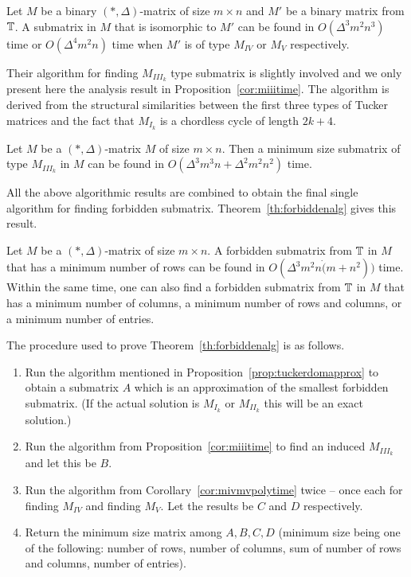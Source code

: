 \begin{corollary} 
  \label{cor:mivmvpolytime}
  Let $M$ be a binary $(*, \Delta)$-matrix of size $m \times n$ and
  $M'$ be a binary matrix from $\mathbb{T}$. A submatrix in $M$ that
  is isomorphic to $M'$ can be found in $O(\Delta^3m^2n^3)$ time or
  $O(\Delta^4m^2n)$ time when $M'$ is of type $M_{IV}$ or $M_V$
  respectively.
\end{corollary}

Their algorithm for finding $M_{III_k}$ type submatrix is slightly
involved and we only present here the analysis result in
Proposition~\ref{cor:miiitime}. The algorithm is derived from the
structural similarities between the first three types of Tucker
matrices and the fact that $M_{I_k}$ is a chordless cycle of length
$2k+4$.

\begin{proposition} 
  \label{cor:miiitime}
  Let $M$ be a $(*,\Delta)$-matrix $M$ of size $m \times n$. Then a
  minimum size submatrix of type $M_{III_k}$ in $M$ can be found in
  $O(\Delta^3m^3n+\Delta^2m^2n^2)$ time.
\end{proposition}

All the above algorithmic results are combined to obtain the final
single algorithm for finding forbidden
submatrix. Theorem~\ref{th:forbiddenalg} gives this result.

\begin{theoremsansproof}
  \label{th:forbiddenalg}
  Let $M$ be a $(*,\Delta)$-matrix of size $m \times n$. A forbidden
  submatrix from $\mathbb{T}$ in $M$ that has a minimum number of rows
  can be found in $O(\Delta^3m^2n\dot(m+n^2))$ time. Within the same
  time, one can also find a forbidden submatrix from $\mathbb{T}$ in
  $M$ that has a minimum number of columns, a minimum number of rows
  and columns, or a minimum number of \un entries.
\end{theoremsansproof}

The procedure used to prove Theorem~\ref{th:forbiddenalg} is as
follows. 
\begin{enumerate}
\item Run the algorithm mentioned in
  Proposition~\ref{prop:tuckerdomapprox} to obtain a submatrix $A$
  which is an approximation of the smallest forbidden submatrix. (If
  the actual solution is $M_{I_k}$ or $M_{II_k}$ this will be an exact
  solution.)
\item Run the algorithm from Proposition~\ref{cor:miiitime} to find
  an induced $M_{III_k}$ and let this be $B$.
\item Run the algorithm from Corollary~\ref{cor:mivmvpolytime} twice
  -- once each for finding $M_{IV}$ and finding $M_{V}$. Let the
  results be $C$ and $D$ respectively.
\item Return the minimum size matrix among $A, B, C, D$ (minimum size
  being one of the following: number of rows, number of columns, sum
  of number of rows and columns, number of {\un} entries).
\end{enumerate}

